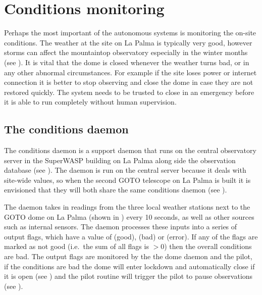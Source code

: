 \newpage
\section{Conditions monitoring}
\label{sec:conditions}
\begin{colsection}


\begin{colsection}

Perhaps the most important of the autonomous systems is monitoring the on-site conditions. The weather at the site on La Palma is typically very good, however storms can affect the mountaintop observatory especially in the winter months (see ). It is vital that the dome is closed whenever the weather turns bad, or in any other abnormal circumstances. For example if the site loses power or internet connection it is better to stop observing and close the dome in case they are not restored quickly. The system needs to be trusted to close in an emergency before it is able to run completely without human supervision.

\end{colsection}

\subsection{The conditions daemon}
\label{sec:conditions_daemon}
\begin{colsection}

The conditions daemon is a support daemon that runs on the central observatory server in the SuperWASP building on La Palma along side the observation database (see ). The daemon is run on the central server because it deals with site-wide values, so when the second GOTO telescope on La Palma is built it is envisioned that they will both share the same conditions daemon (see ).

The daemon takes in readings from the three local weather stations next to the GOTO dome on La Palma (shown in ) every 10 seconds, as well as other sources such as internal sensors. The daemon processes these inputs into a series of output flags, which have a value of  (good),  (bad) or  (error). If any of the flags are marked as not good (i.e.\ the sum of all flags is $>0$) then the overall conditions are bad. The output flags are monitored by the the dome daemon and the pilot, if the conditions are bad the dome will enter lockdown and automatically close if it is open (see ) and the pilot  routine will trigger the pilot to pause observations (see ).


\end{colsection}
\end{colsection}
